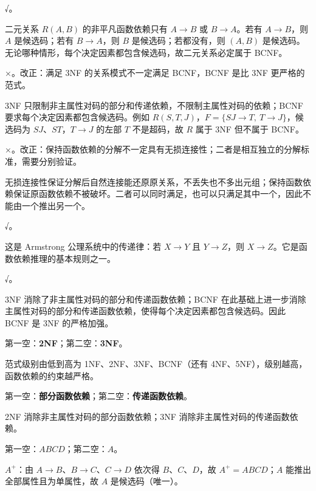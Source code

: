 \documentclass[a4paper,11pt]{article}
\begin{document}

\q √。\begin{analysis}二元关系 $R(A,B)$ 的非平凡函数依赖只有 $A\to B$ 或 $B\to A$。若有 $A\to B$，则 $A$ 是候选码；若有 $B\to A$，则 $B$ 是候选码；若都没有，则 $(A,B)$ 是候选码。无论哪种情形，每个决定因素都包含候选码，故二元关系必定属于 BCNF。\end{analysis}

\q ×。改正：满足 3NF 的关系模式不一定满足 BCNF，BCNF 是比 3NF 更严格的范式。\begin{analysis}3NF 只限制非主属性对码的部分和传递依赖，不限制主属性对码的依赖；BCNF 要求每个决定因素都包含候选码。例如 $R(S,T,J)$，$F=\{SJ\to T,\ T\to J\}$，候选码为 $SJ$、$ST$，$T\to J$ 的左部 $T$ 不是超码，故 $R$ 属于 3NF 但不属于 BCNF。\end{analysis}

\q ×。改正：保持函数依赖的分解不一定具有无损连接性；二者是相互独立的分解标准，需要分别验证。\begin{analysis}无损连接性保证分解后自然连接能还原原关系，不丢失也不多出元组；保持函数依赖保证原函数依赖不被破坏。二者可以同时满足，也可以只满足其中一个，因此不能由一个推出另一个。\end{analysis}

\q √。\begin{analysis}这是 Armstrong 公理系统中的传递律：若 $X\to Y$ 且 $Y\to Z$，则 $X\to Z$。它是函数依赖推理的基本规则之一。\end{analysis}

\q √。\begin{analysis}3NF 消除了非主属性对码的部分和传递函数依赖；BCNF 在此基础上进一步消除主属性对码的部分和传递函数依赖，使得每个决定因素都包含候选码。因此 BCNF 是 3NF 的严格加强。\end{analysis}


\q 第一空：\textbf{2NF}；第二空：\textbf{3NF}。\begin{analysis}范式级别由低到高为 1NF、2NF、3NF、BCNF（还有 4NF、5NF），级别越高，函数依赖的约束越严格。\end{analysis}

\q 第一空：\textbf{部分函数依赖}；第二空：\textbf{传递函数依赖}。\begin{analysis}2NF 消除非主属性对码的部分函数依赖；3NF 消除非主属性对码的传递函数依赖。\end{analysis}

\q 第一空：\textbf{$ABCD$}；第二空：\textbf{$A$}。\begin{analysis}$A^{+}$：由 $A\to B$、$B\to C$、$C\to D$ 依次得 $B$、$C$、$D$，故 $A^{+}=ABCD$；$A$ 能推出全部属性且为单属性，故 $A$ 是候选码（唯一）。\end{analysis}
\end{document}

